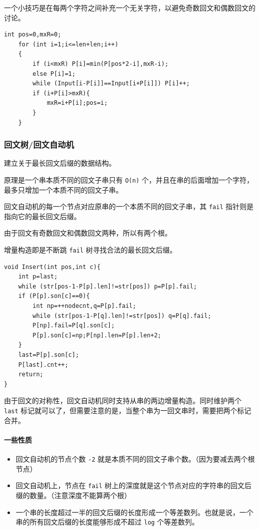 \documentclass[UTF-8]{ctexart}
\begin{document}
	一个小技巧是在每两个字符之间补充一个无关字符，以避免奇数回文和偶数回文的讨论。
\begin{verbatim}
int pos=0,mxR=0;
    for (int i=1;i<=len+len;i++)
    {
        if (i<mxR) P[i]=min(P[pos*2-i],mxR-i);
        else P[i]=1;
        while (Input[i-P[i]]==Input[i+P[i]]) P[i]++;
        if (i+P[i]>mxR){
            mxR=i+P[i];pos=i;
        }
    }
\end{verbatim}
	
	\subsubsection{回文树/回文自动机}
	建立关于最长回文后缀的数据结构。
	
	原理是一个串本质不同的回文子串只有 \texttt{O(n)} 个，并且在串的后面增加一个字符，最多只增加一个本质不同的回文子串。
	
	回文自动机的每一个节点对应原串的一个本质不同的回文子串，其 \texttt{fail} 指针则是指向它的最长回文后缀。
	
	由于回文有奇数回文和偶数回文两种，所以有两个根。
	
	增量构造即是不断跳 \texttt{fail} 树寻找合法的最长回文后缀。
	
\begin{verbatim}
void Insert(int pos,int c){
    int p=last;
    while (str[pos-1-P[p].len]!=str[pos]) p=P[p].fail;
    if (P[p].son[c]==0){
        int np=++nodecnt,q=P[p].fail;
        while (str[pos-1-P[q].len]!=str[pos]) q=P[q].fail;
        P[np].fail=P[q].son[c];
        P[p].son[c]=np;P[np].len=P[p].len+2;
    }
    last=P[p].son[c];
    P[last].cnt++;
    return;
}
\end{verbatim}

	由于回文的对称性，回文自动机同时支持从串的两边增量构造。同时维护两个 \texttt{last} 标记就可以了，但需要注意的是，当整个串为一回文串时，需要把两个标记合并。
	
	\paragraph{一些性质}
	\begin{itemize}
		\item 回文自动机的节点个数 \texttt{-2} 就是本质不同的回文子串个数。（因为要减去两个根节点）
		\item 回文自动机上，节点在 \texttt{fail} 树上的深度就是这个节点对应的字符串的回文后缀的数量。（注意深度不能算两个根）
		\item 一个串的长度超过一半的回文后缀的长度形成一个等差数列。也就是说，一个串的所有回文后缀的长度能够形成不超过 \texttt{log} 个等差数列。
	\end{itemize}
	
\end{document}
